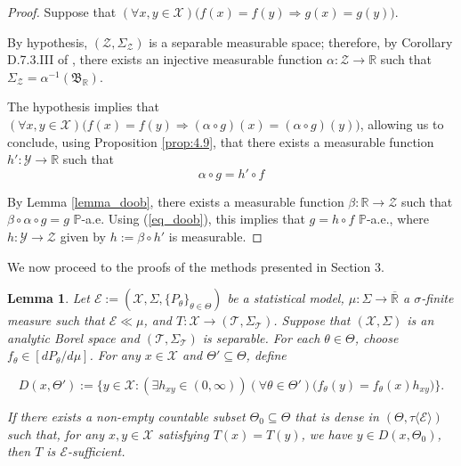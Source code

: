\documentclass[12pt]{article}
\newtheorem{lemma}{Lemma}[section]
\begin{document}
\begin{proof}
Suppose that $(\forall x,y\in \mathcal{X})\big(f(x)=f(y)\Rightarrow g(x)=g(y)\big)$.

By hypothesis, $(\mathcal{Z},\Sigma _\mathcal{Z})$ is a separable measurable space; therefore, by Corollary D.7.3.III of \cite{Cavalcante2026}, there exists an injective measurable function $\alpha:\mathcal{Z}\to\mathbb{R}$ such that $\Sigma_\mathcal{Z}=\alpha ^{-1}(\mathfrak{B}_\mathbb{R})$.

The hypothesis implies that $(\forall x,y\in \mathcal{X})(f(x)=f(y)\Rightarrow (\alpha \circ g)(x)=(\alpha \circ g)(y)\big)$, allowing us to conclude, using Proposition \ref{prop:4.9}, that there exists a measurable function $h':\mathcal{Y}\to \mathbb{R}$ such that 
\begin{equation}
\label{eq_doob}
\alpha \circ g=h'\circ f
\end{equation}

By Lemma \ref{lemma_doob}, there exists a measurable function $\beta:\mathbb{R}\to \mathcal{Z}$ such that $\beta\circ \alpha\circ g=g$ $\mathbb{P}$-a.e. Using (\ref{eq_doob}), this implies that $g=h\circ f$ $\mathbb{P}$-a.e., where $h:\mathcal{Y}\to \mathcal{Z}$ given by $h:=\beta \circ h'$ is measurable.
\end{proof}

We now proceed to the proofs of the methods presented in Section 3.

\begin{lemma}
\label{lemma:4.1}
Let $\mathcal{E}:=(\mathcal{X},\Sigma,\{P_\theta\}_{\theta\in\Theta})$ be a statistical model, $\mu :\Sigma\to\overline{\mathbb{R}}$ a $\sigma$-finite measure such that $\mathcal{E}\ll \mu$, and $T:\mathcal{X}\to (\mathcal{T},\Sigma _\mathcal{T})$. Suppose that $(\mathcal{X},\Sigma )$ is an analytic Borel space and $(\mathcal{T},\Sigma _\mathcal{T})$ is separable. For each $\theta\in\Theta$, choose $f_\theta \in [dP_\theta /d\mu ]$. For any $x\in \mathcal{X}$ and $\Theta'\subseteq\Theta$, define

$$D(x,\Theta '):=\big\{y\in \mathcal{X}:(\exists h_{xy}\in (0,\infty ))(\forall \theta \in \Theta ')\big(f_\theta (y)=f_\theta (x)h_{xy}\big)\big\}.$$

If there exists a non-empty countable subset $\Theta _0\subseteq\Theta$ that is dense in $(\Theta,\tau \langle \mathcal{E}\rangle )$ such that, for any $x,y\in\mathcal{X}$ satisfying $T(x)=T(y)$, we have $y\in D(x,\Theta _0)$, then $T$ is $\mathcal{E}$-sufficient.
\end{lemma}
\end{document}
